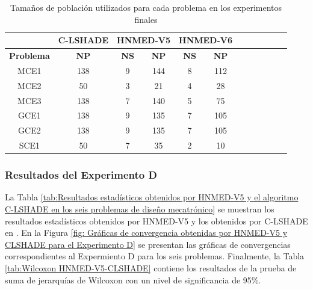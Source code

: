 \begin{table}[]
	\centering
	\caption{Tamaños de población utilizados para cada problema en los experimentos finales}
	\label{tab:Tamaños de población utilizados para cada problema en los experimentos finales}
	
	\begin{tabular}{cccccccccccc}
		& \textbf{C-LSHADE } & \multicolumn{2}{l}{\textbf{HNMED-V5}}&\multicolumn{2}{l}{\textbf{HNMED-V6}}\\
		\hline
		\textbf{Problema} & \textbf{NP}    & \textbf{NS} & \textbf{NP}& \textbf{NS}& \textbf{NP}\\
		\hline
		MCE1     & 138           & 9           & 144 &8&112   \\
		MCE2     & 50            & 3           & 21  &4&28       \\
		MCE3     & 138           & 7           & 140 &5&75      \\
		GCE1     & 138           & 9           & 135 &7&105        \\
		GCE2     & 138           & 9           & 135 &7&105    \\
		SCE1     & 50            & 7           & 35  &2&10       
	\end{tabular}
	
\end{table}


\subsubsection{Resultados del Experimento D}
La Tabla \ref{tab:Resultados estadísticos obtenidos por HNMED-V5 y el algoritmo C-LSHADE en los seis problemas de diseño mecatrónico} se muestran los resultados estadísticos obtenidos por HNMED-V5 y los obtenidos por C-LSHADE en \cite{zapata_zapata_control_2017}. En la Figura \ref{fig: Gráficas de convergencia obtenidas por HNMED-V5 y CLSHADE para el Experimento D} se presentan las gráficas de convergencias correspondientes al Expermiento D para los seis problemas. Finalmente, la Tabla \ref{tab:Wilcoxon HNMED-V5-CLSHADE} contiene los resultados de la prueba de suma de jerarquías de Wilcoxon con un nivel de significancia de 95\%.

